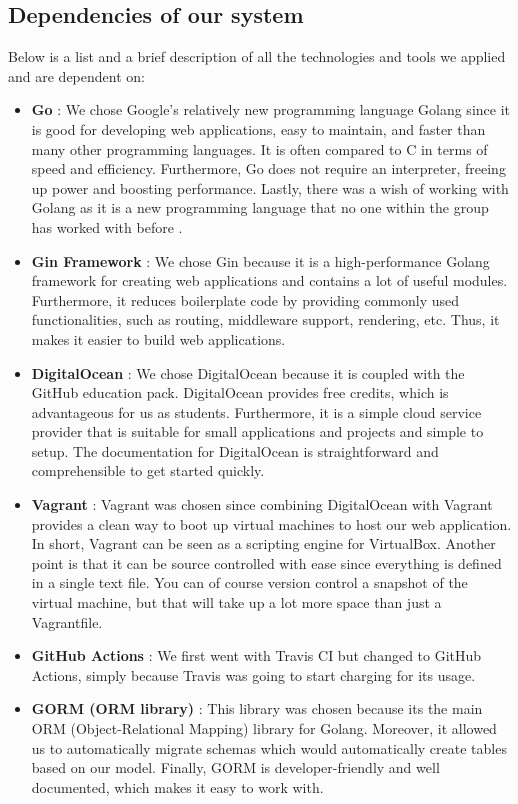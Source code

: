 \subsection{Dependencies of our system}
Below is a list and a brief description of all the technologies and tools we applied and are dependent on:

\begin{itemize}
    \item \textbf{Go} \cite{golang}: We chose Google's relatively new programming language Golang since it is good for developing web applications, easy to maintain, and faster than many other programming languages. It is often compared to C in terms of speed and efficiency. Furthermore, Go does not require an interpreter, freeing up power and boosting performance. Lastly, there was a wish of working with Golang as it is a new programming language that no one within the group has worked with before \cite{whyusego}.
    \item \textbf{Gin Framework} \cite{gin}: We chose Gin because it is a high-performance Golang framework for creating web applications and contains a lot of useful modules. Furthermore, it reduces boilerplate code by providing commonly used functionalities, such as routing, middleware support, rendering, etc. Thus, it makes it easier to build web applications. 
    \item \textbf{DigitalOcean} \cite{digitalOcean}: We chose DigitalOcean because it is coupled with the GitHub education pack. DigitalOcean provides free credits, which is advantageous for us as students. Furthermore, it is a simple cloud service provider that is suitable for small applications and projects and simple to setup. The documentation for DigitalOcean is straightforward and comprehensible to get started quickly. 
    \item \textbf{Vagrant} \cite{vagrant}: Vagrant was chosen since combining DigitalOcean with Vagrant provides a clean way to boot up virtual machines to host our web application. In short, Vagrant can be seen as a scripting engine for VirtualBox. Another point is that it can be source controlled with ease since everything is defined in a single text file. You can of course version control a snapshot of the virtual machine, but that will take up a lot more space than just a Vagrantfile.
    \item \textbf{GitHub Actions} \cite{githubActions}: We first went with Travis CI but changed to GitHub Actions, simply because Travis was going to start charging for its usage. 
    \item \textbf{GORM (ORM library)} \cite{gorm}: This library was chosen because its the main ORM (Object-Relational Mapping) library for Golang. Moreover, it allowed us to automatically migrate schemas which would automatically create tables based on our model. Finally, GORM is developer-friendly and well documented, which makes it easy to work with. 

\end{itemize}
